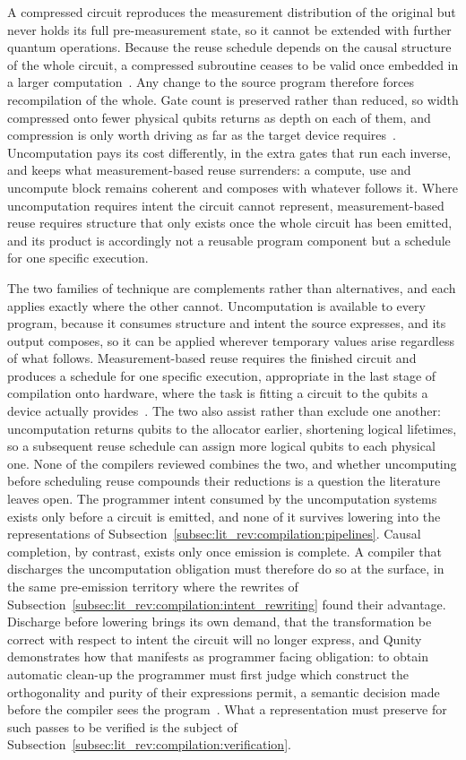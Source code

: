 A compressed circuit reproduces the measurement distribution of the original but never holds its full pre-measurement state, so it cannot be extended with further quantum operations.
Because the reuse schedule depends on the causal structure of the whole circuit, a compressed subroutine ceases to be valid once embedded in a larger computation~\cite{kissinger2022qubitreuse}.
Any change to the source program therefore forces recompilation of the whole.
Gate count is preserved rather than reduced, so width compressed onto fewer physical qubits returns as depth on each of them, and compression is only worth driving as far as the target device requires~\cite{kissinger2022qubitreuse}.
Uncomputation pays its cost differently, in the extra gates that run each inverse, and keeps what measurement-based reuse surrenders: a compute, use and uncompute block remains coherent and composes with whatever follows it.
Where uncomputation requires intent the circuit cannot represent, measurement-based reuse requires structure that only exists once the whole circuit has been emitted, and its product is accordingly not a reusable program component but a schedule for one specific execution.

The two families of technique are complements rather than alternatives, and each applies exactly where the other cannot.
Uncomputation is available to every program, because it consumes structure and intent the source expresses, and its output composes, so it can be applied wherever temporary values arise regardless of what follows.
Measurement-based reuse requires the finished circuit and produces a schedule for one specific execution, appropriate in the last stage of compilation onto hardware, where the task is fitting a circuit to the qubits a device actually provides~\cite{kissinger2022qubitreuse}.
The two also assist rather than exclude one another: uncomputation returns qubits to the allocator earlier, shortening logical lifetimes, so a subsequent reuse schedule can assign more logical qubits to each physical one.
None of the compilers reviewed combines the two, and whether uncomputing before scheduling reuse compounds their reductions is a question the literature leaves open.
The programmer intent consumed by the uncomputation systems exists only before a circuit is emitted, and none of it survives lowering into the representations of Subsection~\ref{subsec:lit_rev:compilation:pipelines}.
Causal completion, by contrast, exists only once emission is complete.
A compiler that discharges the uncomputation obligation must therefore do so at the surface, in the same pre-emission territory where the rewrites of Subsection~\ref{subsec:lit_rev:compilation:intent_rewriting} found their advantage.
Discharge before lowering brings its own demand, that the transformation be correct with respect to intent the circuit will no longer express, and Qunity demonstrates how that manifests as programmer facing obligation: to obtain automatic clean-up the programmer must first judge which construct the orthogonality and purity of their expressions permit, a semantic decision made before the compiler sees the program~\cite{mints2025qunity}.
What a representation must preserve for such passes to be verified is the subject of Subsection~\ref{subsec:lit_rev:compilation:verification}.

